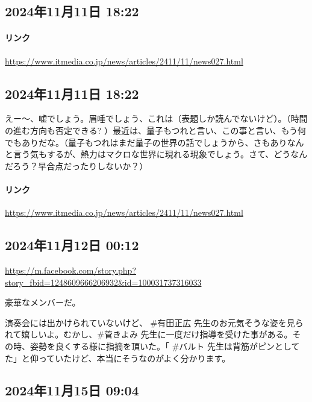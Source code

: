 \subsection*{2024年11月11日 18:22}

\paragraph{リンク}
\url{https://www.itmedia.co.jp/news/articles/2411/11/news027.html}

\subsection*{2024年11月11日 18:22}

えー〜、嘘でしょう。眉唾でしょう、これは（表題しか読んでないけど）。（時間の進む方向も否定できる? ）最近は、量子もつれと言い、この事と言い、もう何でもありだな。（量子もつれはまだ量子の世界の話でしょうから、さもありなんと言う気もするが、熱力はマクロな世界に現れる現象でしょう。さて、どうなんだろう？早合点だったりしないか？）

\paragraph{リンク}
\url{https://www.itmedia.co.jp/news/articles/2411/11/news027.html}

\subsection*{2024年11月12日 00:12}

\url{https://m.facebook.com/story.php?story_fbid=1248609666206932&id=100031737316033}

豪華なメンバーだ。

演奏会には出かけられていないけど、 \#有田正広 先生のお元気そうな姿を見られて嬉しいよ。むかし、\#菅きよみ 先生に一度だけ指導を受けた事がある。その時、姿勢を良くする様に指摘を頂いた。「 \#バルト 先生は背筋がピンとしてた」と仰っていたけど、本当にそうなのがよく分かります。

\subsection*{2024年11月15日 09:04}

